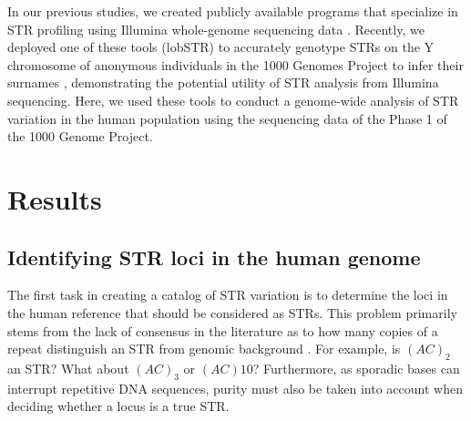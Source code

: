 In our previous studies, we created publicly available programs that specialize in STR profiling using Illumina whole-genome sequencing data \cite{GymrekGolanRossetEtAl2012,HighnamFranckMartinEtAl2013}. Recently, we deployed one of these tools (lobSTR) to accurately genotype STRs on the Y chromosome of anonymous individuals in the 1000 Genomes Project to infer their surnames \cite{GymrekMcGuireGolanEtAl2013}, demonstrating the potential utility of STR analysis from Illumina sequencing. Here, we used these tools to conduct a genome-wide analysis of STR variation in the human population using the sequencing data of the Phase 1 of the 1000 Genome Project.

\section{Results}
\subsection{Identifying STR loci in the human genome}
The first task in creating a catalog of STR variation is to determine the loci in the human reference that should be considered as STRs. This problem primarily stems from the lack of consensus in the literature as to how many copies of a repeat distinguish an STR from genomic background \cite{LeclercqRivalsJarne2007,FondonMartinRichardsEtAl2012,SchaperKajavaHauserEtAl2012}. For example, is $(AC)_2$ an STR? What about $(AC)_3$ or $(AC)10$? Furthermore, as sporadic bases can interrupt repetitive DNA sequences, purity must also be taken into account when deciding whether a locus is a true STR.  

